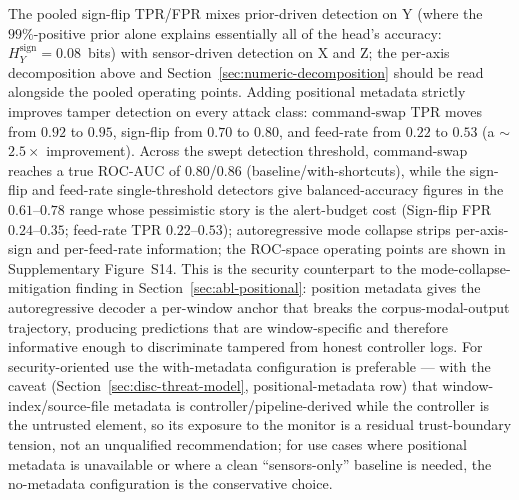 \documentclass[sensors,article,submit,moreauthors,pdftex]{Definitions/mdpi}
\begin{document}
The pooled sign-flip TPR/FPR mixes prior-driven detection on Y (where the $99\%$-positive prior alone explains essentially all of the head's accuracy: $H_{Y}^{\text{sign}}=0.08$~bits) with sensor-driven detection on X and Z; the per-axis decomposition above and Section~\ref{sec:numeric-decomposition} should be read alongside the pooled operating points. Adding positional metadata strictly improves tamper detection on every attack class: command-swap TPR moves from $0.92$ to $0.95$, sign-flip from $0.70$ to $0.80$, and feed-rate from $0.22$ to $0.53$ (a $\sim$$2.5\times$ improvement). Across the swept detection threshold, command-swap reaches a true ROC-AUC of $0.80$/$0.86$ (baseline/with-shortcuts), while the sign-flip and feed-rate single-threshold detectors give balanced-accuracy figures in the $0.61$--$0.78$ range whose pessimistic story is the alert-budget cost (Sign-flip FPR $0.24$--$0.35$; feed-rate TPR $0.22$--$0.53$); autoregressive mode collapse strips per-axis-sign and per-feed-rate information; the ROC-space operating points are shown in Supplementary Figure~S14. This is the security counterpart to the mode-collapse-mitigation finding in Section~\ref{sec:abl-positional}: position metadata gives the autoregressive decoder a per-window anchor that breaks the corpus-modal-output trajectory, producing predictions that are window-specific and therefore informative enough to discriminate tampered from honest controller logs. For security-oriented use the with-metadata configuration is preferable --- with the caveat (Section~\ref{sec:disc-threat-model}, positional-metadata row) that window-index/source-file metadata is controller/pipeline-derived while the controller is the untrusted element, so its exposure to the monitor is a residual trust-boundary tension, not an unqualified recommendation; for use cases where positional metadata is unavailable or where a clean ``sensors-only'' baseline is needed, the no-metadata configuration is the conservative choice.
\end{document}
